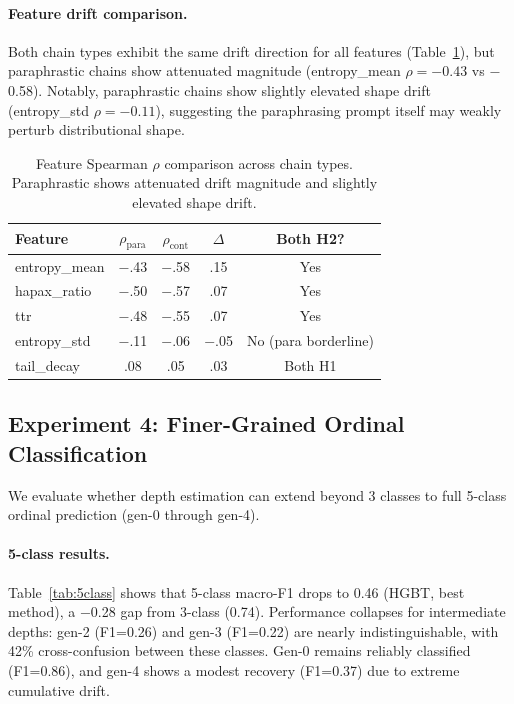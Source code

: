 \documentclass[11pt,a4paper]{article}
\begin{document}
\paragraph{Feature drift comparison.} Both chain types exhibit the same drift direction for all features (Table~\ref{tab:drift_compare}), but paraphrastic chains show attenuated magnitude (entropy\_mean $\rho{=}{-}0.43$ vs $-$0.58). Notably, paraphrastic chains show slightly elevated shape drift (entropy\_std $\rho{=}{-}0.11$), suggesting the paraphrasing prompt itself may weakly perturb distributional shape.

\begin{table}[t]
\centering
\small
\begin{tabular}{lcccc}
\toprule
Feature & $\rho_{\text{para}}$ & $\rho_{\text{cont}}$ & $\Delta$ & Both H2? \\
\midrule
entropy\_mean & $-$.43 & $-$.58 & .15 & Yes \\
hapax\_ratio & $-$.50 & $-$.57 & .07 & Yes \\
ttr & $-$.48 & $-$.55 & .07 & Yes \\
entropy\_std & $-$.11 & $-$.06 & $-$.05 & No (para borderline) \\
tail\_decay & .08 & .05 & .03 & Both H1 \\
\bottomrule
\end{tabular}
\caption{Feature Spearman $\rho$ comparison across chain types. Paraphrastic shows attenuated drift magnitude and slightly elevated shape drift.}
\label{tab:drift_compare}
\end{table}

\subsection{Experiment 4: Finer-Grained Ordinal Classification}
\label{sec:exp4}

We evaluate whether depth estimation can extend beyond 3 classes to full 5-class ordinal prediction (gen-0 through gen-4).

\paragraph{5-class results.} Table~\ref{tab:5class} shows that 5-class macro-F1 drops to 0.46 (HGBT, best method), a $-$0.28 gap from 3-class (0.74). Performance collapses for intermediate depths: gen-2 (F1=0.26) and gen-3 (F1=0.22) are nearly indistinguishable, with 42\% cross-confusion between these classes. Gen-0 remains reliably classified (F1=0.86), and gen-4 shows a modest recovery (F1=0.37) due to extreme cumulative drift.
\end{document}
